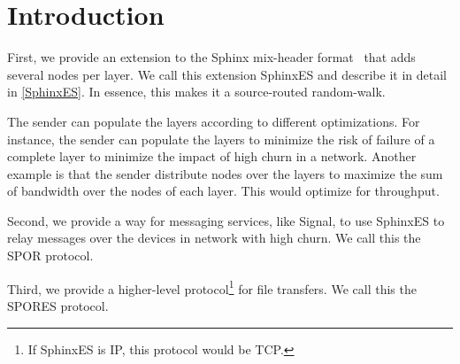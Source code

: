 
\section{Introduction}


First, we provide an extension to the Sphinx mix-header format~\cite{Sphinx} 
that adds several nodes per layer.
We call this extension SphinxES and describe it in detail in \cref{SphinxES}.
In essence, this makes it a source-routed random-walk.

The sender can populate the layers according to different optimizations.
For instance, the sender can populate the layers to minimize the risk of 
failure of a complete layer to minimize the impact of high churn in a 
network.
Another example is that the sender distribute nodes over the layers to maximize 
the sum of bandwidth over the nodes of each layer.
This would optimize for throughput.

Second, we provide a way for messaging services, like Signal, to use SphinxES 
to relay messages over the devices in  network with high churn.
We call this the \ac{SPOR} protocol.

Third, we provide a higher-level protocol\footnote{%
  If SphinxES is IP, this protocol would be TCP.
} for file transfers.
We call this the \ac{SPORES} protocol.

\endinput

